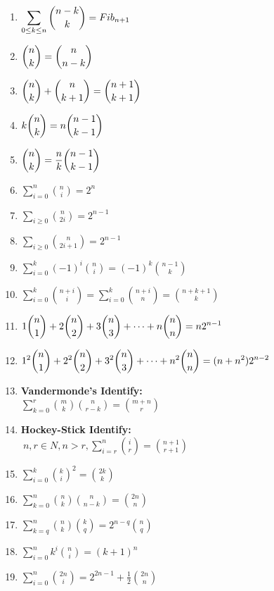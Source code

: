 \begin{enumerate}
    \item $\displaystyle \displaystyle \sum \limits_{0\leq k \leq n} {n-k \choose k} = Fib_{n+1}$
    \item $\displaystyle \displaystyle {n \choose k}={n \choose n-k}$
    \item $\displaystyle \displaystyle {n \choose k}+{n \choose k+1}={n+1 \choose k+1}$
    \item $\displaystyle \displaystyle k{n \choose k}=n{n-1 \choose k-1}$
    \item $\displaystyle \displaystyle {n \choose k}=\frac{n}{k}{n-1 \choose k-1}$
    \item $\displaystyle \sum \limits_{i=0}^n{n \choose i}=2^n$
    \item $\displaystyle \sum \limits_{i\geq 0}{n \choose 2i}=2^{n-1}$
    \item $\displaystyle \sum \limits_{i\geq 0}{n \choose 2i+1}=2^{n-1}$
    \item $\displaystyle \sum \limits_{i= 0}^k \left( -1 \right) ^i{n \choose i}=\left( -1 \right) ^k{n-1 \choose k}$
    \item $\displaystyle \sum \limits_{i= 0}^k{n+i \choose i}= \sum \limits_{i= 0}^k{n+i \choose n} = {n+k+1 \choose k}$
    \item $\displaystyle \displaystyle1{n \choose 1}+2{n \choose 2}+3{n \choose 3}+\dots+n{n \choose n}=n2^{n-1}$
    \item $\displaystyle \displaystyle1^2{n \choose 1}+2^2{n \choose 2}+3^2{n \choose 3}+\dots+n^2{n \choose n}=(n+n^2)2^{n-2}$
    \item \textbf{Vandermonde’s Identify:} \\ $\displaystyle \sum \limits_{k=0}^r{m \choose k}{n \choose r-k}={m+n \choose r}$
    \item \textbf{Hockey-Stick Identify:} \\ $\displaystyle \ n,r \in N, n > r, \sum \limits_{i=r}^n{i \choose r}={n+1 \choose r+1}$
    \item $\displaystyle \sum \limits_{i=0}^k{k \choose i}^2={2k \choose k}$
    \item $\displaystyle \sum \limits_{k=0}^n{n \choose k}{n \choose n-k}={2n \choose n}$
    \item $\displaystyle \sum \limits_{k=q}^n{n \choose k}{k \choose q}=2^{n-q}{n \choose q}$
    \item $\displaystyle \sum \limits_{i=0}^nk^i{n \choose i}=(k+1)^n$
    \item $\displaystyle \sum \limits_{i=0}^n{2n \choose i}=2^{2n-1}+\frac{1}{2}{2n \choose n}$

\end{enumerate}
